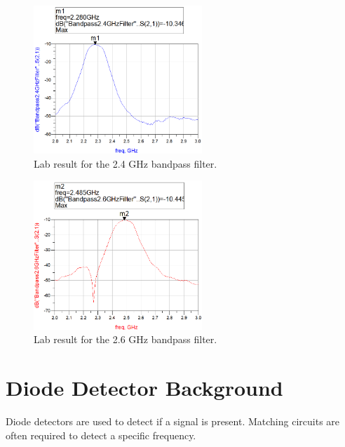\documentclass[conference]{IEEEtran}
\begin{document}
\begin{figure}[!htb]
\centering
\includegraphics[width=2.5in]{bandpass-pics/bpf24.png}
\caption{Lab result for the 2.4 GHz bandpass filter.}
\label{fig:bpf24}
\end{figure}

\begin{figure}[!htb]
\centering
\includegraphics[width=2.5in]{bandpass-pics/bpf26.png}
\caption{Lab result for the 2.6 GHz bandpass filter.}
\label{fig:bpf26}
\end{figure}

\section{Diode Detector Background}
Diode detectors are used to detect if a signal is present. Matching circuits are often required to detect a specific frequency.
\end{document}

